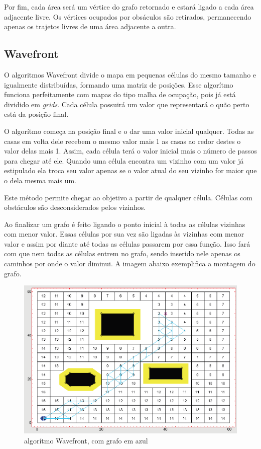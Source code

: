 Por fim, cada área será um vértice do grafo retornado e estará ligado a cada área adjacente livre.  Os vértices ocupados por obsáculos são retirados, permanecendo apenas os trajetos livres de uma área adjacente a outra.

\subsection{Wavefront}

O algoritmos Wavefront divide o mapa em pequenas células do mesmo tamanho e igualmente distribuídas, formando uma matriz de posições. Esse algorítmo funciona perfeitamente com mapas do tipo malha de ocupação, pois já está dividido em \textit{grids}. Cada célula possuirá um valor que representará o quão perto está da posição final.

O algorítmo começa na posição final e o dar uma valor inicial qualquer. Todas as casas em volta dele recebem o mesmo valor mais 1 as casas ao redor destes o valor delas mais 1. Assim, cada célula terá o valor inicial mais o número de passos para chegar até ele. Quando uma célula encontra um vizinho com um valor já estipulado ela troca seu valor apenas se o valor atual do seu vizinho for maior que o dela mesma mais um.

Este método permite chegar ao objetivo a partir de qualquer célula. Células com obstáculos são desconsiderados pelos vizinhos. 

Ao finalizar um grafo é feito ligando o ponto inicial à todas as células vizinhas com menor valor. Essas células por sua vez são ligadas às vizinhas com menor valor e assim por diante até todas as células passarem por essa função. Isso fará com que nem todas as células entrem no grafo, sendo inserido nele apenas os caminhos por onde o valor diminui. A imagem abaixo exemplifica a montagem do grafo.

\begin{figure}[h]
	\centering
	\label{fig10}
		\includegraphics[keepaspectratio=true,scale=0.5]{figuras/10wavefront.png}
	\caption{algorítmo Wavefront, com grafo em azul}
\end{figure}

